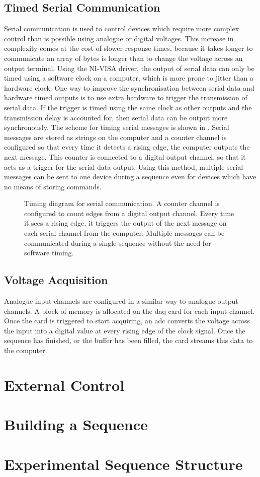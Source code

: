 \subsection{Timed Serial Communication}\label{subsec:compinterface_serial}
Serial communication is used to control devices which require more complex control than is possible using analogue or digital voltages. This increase in complexity comes at the cost of slower response times, because it takes longer to communicate an array of bytes is longer than to change the voltage across an output terminal. Using the NI-VISA driver, the output of serial data can only be timed using a software clock on a computer, which is more prone to jitter than a hardware clock. One way to improve the synchronisation between serial data and hardware timed outputs is to use extra hardware to trigger the transmission of serial data. If the trigger is timed using the same clock as other outputs and the transmission delay is accounted for, then serial data can be output more synchronously. The scheme for timing serial messages is shown in . Serial messages are stored as strings on the computer and a counter channel is configured so that every time it detects a rising edge, the computer outputs the next message. This counter is connected to a digital output channel, so that it acts as a trigger for the serial data output. Using this method, multiple serial messages can be sent to one device during a sequence even for devices which have no means of storing commands.
\begin{figure}
    \centering
    \caption[Timing diagram for serial communication]{Timing diagram for serial communication. A counter channel is configured to count edges from a digital output channel. Every time it sees a rising edge, it triggers the output of the next message on each serial channel from the computer. Multiple messages can be communicated during a single sequence without the need for software timing.}
    \label{fig:serial_timing}
\end{figure} 
\subsection{Voltage Acquisition}\label{subsec:compinterface_mmacquisition}
Analogue input channels are configured in a similar way to analogue output channels. A block of memory is allocated on the \ac{daq} card for each input channel. Once the card is triggered to start acquiring, an \ac{adc} converts the voltage across the input into a digital value at every rising edge of the clock signal. Once the sequence has finished, or the buffer has been filled, the card streams this data to the computer. 

\section{External Control}

\section{Building a Sequence}

\section{Experimental Sequence Structure}
